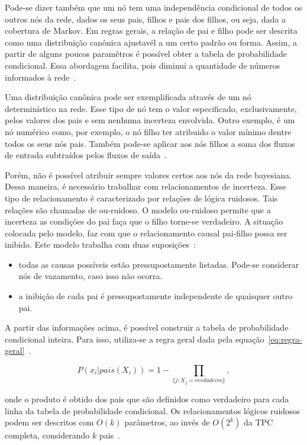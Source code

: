 Pode-se dizer também que um nó tem uma independência condicional de todos os outros nós da rede, dados os seus pais, filhos e pais dos filhos, ou seja, dada a cobertura de Markov. Em regras gerais, a relação de pai e filho pode ser descrita como uma distribuição canônica ajustavél a um certo padrão ou forma. Assim, a partir de alguns poucos paramêtros é possível obter a tabela de probabilidade condicional. Essa abordagem facilita, pois diminui a quantidade de números informados à rede~\cite{Russell:2002}.

Uma distribuição canônica pode ser exemplificada através de um nó determinístico na rede. Esse tipo de nó tem o valor especificado, exclusivamente, pelos valores dos pais e sem nenhuma incerteza envolvida. Outro exemplo, é um nó numérico como, por exemplo, o nó filho ter atribuido o valor mínimo dentre todos os seus nós pais. Também pode-se aplicar aos nós filhos a soma dos fluxos de entrada subtraídos pelos fluxos de saída~\cite{Russell:2002}.

Porém, não é possível atribuir sempre valores certos aos nós da rede bayesiana. Dessa maneira, é necessário trabalhar com relacionamentos de incerteza. Esse tipo de relacionamento é caracterizado por relações de lógica ruidosos. Tais relações são chamadas de ou-ruidoso. O modelo ou-ruidoso permite que a incerteza as condições do pai faça que o filho torne-se verdadeiro. A situação colocada pelo modelo, faz com que o relacionamento causal pai-filho possa ser inibido. Este modelo trabalha com duas suposições~\cite{Russell:2002}:

\begin{itemize}
    \item todas as causas possíveis estão pressupostamente listadas. Pode-se considerar nós de vazamento, caso isso não ocorra.
    \item a inibição de cada pai é pressupostamente independente de quaisquer outro pai.
\end{itemize}

A partir das informações acima, é possível construir a tabela de probabilidade condicional inteira. Para isso, utiliza-se a regra geral dada pela equação~\ref{eq:regra-geral}~\cite{Russell:2002}.

\begin{equation}
    \label{eq:regra-geral}
    P(x_i|pais(X_i)) = 1 - \prod_{\{j:X_j = verdadeiro\}} ,
\end{equation}

onde o produto é obtido dos pais que são definidos como verdadeiro para cada linha da tabela de probabilidade condicional. Os relacionamentos lógicos ruidosos podem ser descritos com $O(k)$ parâmetros, ao invés de $O(2^k)$ da TPC completa, considerando $k$ pais~\cite{Russell:2002}.

